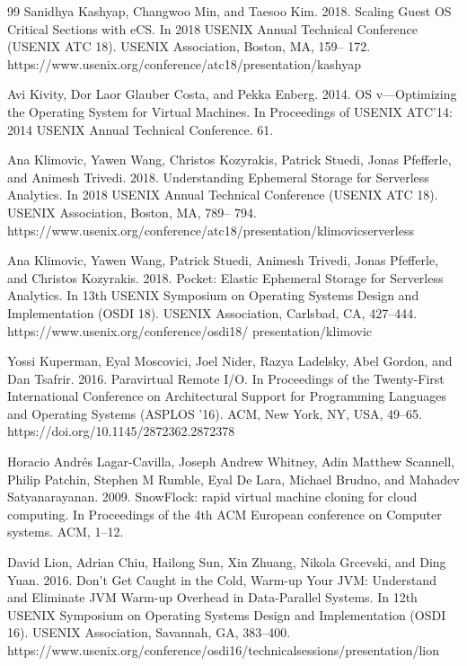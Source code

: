 \begin{thebibliography}{99}
 Sanidhya Kashyap, Changwoo Min, and Taesoo Kim. 2018. Scaling Guest OS Critical Sections with eCS. In 2018 USENIX Annual Technical Conference (USENIX ATC 18). USENIX Association, Boston, MA, 159-- 172. https://www.usenix.org/conference/atc18/presentation/kashyap

 Avi Kivity, Dor Laor Glauber Costa, and Pekka Enberg. 2014. OS v---Optimizing the Operating System for Virtual Machines. In Proceedings of USENIX ATC'14: 2014 USENIX Annual Technical Conference. 61.

 Ana Klimovic, Yawen Wang, Christos Kozyrakis, Patrick Stuedi, Jonas Pfefferle, and Animesh Trivedi. 2018. Understanding Ephemeral Storage for Serverless Analytics. In 2018 USENIX Annual Technical Conference (USENIX ATC 18). USENIX Association, Boston, MA, 789-- 794. https://www.usenix.org/conference/atc18/presentation/klimovicserverless

 Ana Klimovic, Yawen Wang, Patrick Stuedi, Animesh Trivedi, Jonas Pfefferle, and Christos Kozyrakis. 2018. Pocket: Elastic Ephemeral Storage for Serverless Analytics. In 13th USENIX Symposium on Operating Systems Design and Implementation (OSDI 18). USENIX Association, Carlsbad, CA, 427--444. https://www.usenix.org/conference/osdi18/ presentation/klimovic

 Yossi Kuperman, Eyal Moscovici, Joel Nider, Razya Ladelsky, Abel Gordon, and Dan Tsafrir. 2016. Paravirtual Remote I/O. In Proceedings of the Twenty-First International Conference on Architectural Support for Programming Languages and Operating Systems (ASPLOS '16). ACM, New York, NY, USA, 49--65. https://doi.org/10.1145/2872362.2872378

 Horacio Andrés Lagar-Cavilla, Joseph Andrew Whitney, Adin Matthew Scannell, Philip Patchin, Stephen M Rumble, Eyal De Lara, Michael Brudno, and Mahadev Satyanarayanan. 2009. SnowFlock: rapid virtual machine cloning for cloud computing. In Proceedings of the 4th ACM European conference on Computer systems. ACM, 1--12.

 David Lion, Adrian Chiu, Hailong Sun, Xin Zhuang, Nikola Grcevski, and Ding Yuan. 2016. Don't Get Caught in the Cold, Warm-up Your JVM: Understand and Eliminate JVM Warm-up Overhead in Data-Parallel Systems. In 12th USENIX Symposium on Operating Systems Design and Implementation (OSDI 16). USENIX Association, Savannah, GA, 383--400. https://www.usenix.org/conference/osdi16/technicalsessions/presentation/lion


\end{thebibliography}
